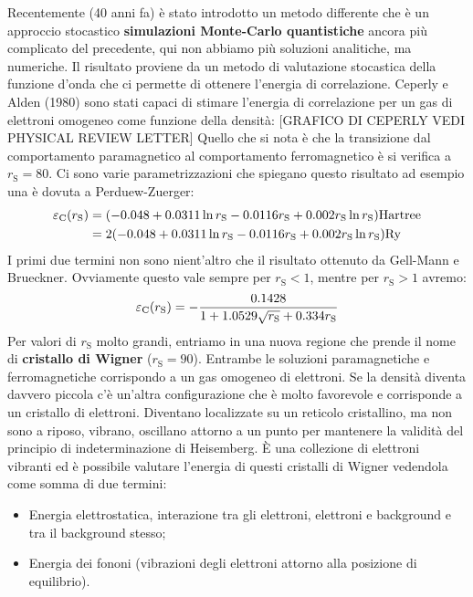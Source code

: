 Recentemente (40 anni fa) è stato introdotto un metodo differente che è un approccio stocastico \textbf{simulazioni Monte-Carlo quantistiche} ancora più complicato del precedente, qui non abbiamo più soluzioni analitiche, ma numeriche. Il risultato proviene da un metodo di valutazione stocastica della funzione d'onda che ci permette di ottenere l'energia di correlazione. Ceperly e Alden (1980) sono stati capaci di stimare l'energia di correlazione per un gas di elettroni omogeneo come funzione della densità:
[GRAFICO DI CEPERLY VEDI PHYSICAL REVIEW LETTER]
Quello che si nota è che la transizione dal comportamento paramagnetico al comportamento ferromagnetico è si verifica a $r_\text{S}=80$. Ci sono varie parametrizzazioni che spiegano questo risultato ad esempio una è dovuta a Perduew-Zuerger:
\begin{equation*}
    \begin{aligned}
    \varepsilon_{\text C}(r_\text{S})& =(-0.048+0.0311 \ln r_\text{S}-0.0116r_\text{S}+0.002r_\text{S}\ln r_\text{S})\text{Hartree}\\
    & =2(-0.048+0.0311 \ln r_\text{S}-0.0116r_\text{S}+0.002r_\text{S}\ln r_\text{S})\text{Ry}
    \end{aligned}
\end{equation*}
I primi due termini non sono nient'altro che il risultato ottenuto da Gell-Mann e Brueckner. Ovviamente questo vale sempre per $r_\text{S}<1$, mentre per $r_\text{S}>1$ avremo:
\begin{equation*}
    \varepsilon_{\text C}(r_\text{S})=-\frac{0.1428}{1+1.0529\sqrt{r_\text{S}}+0.334r_\text{S}}
\end{equation*}
Per valori di $r_\text{S}$ molto grandi, entriamo in una nuova regione che prende il nome di \textbf{cristallo di Wigner} ($r_\text{S}=90$). Entrambe le soluzioni paramagnetiche e ferromagnetiche corrispondo a un gas omogeneo di elettroni. Se la densità diventa davvero piccola c'è un'altra configurazione che è molto favorevole e corrisponde a un cristallo di elettroni. Diventano localizzate su un reticolo cristallino, ma non sono a riposo, vibrano, oscillano attorno a un punto per mantenere la validità del principio di indeterminazione di Heisemberg. È una collezione di elettroni vibranti ed è possibile valutare l'energia di questi cristalli di Wigner vedendola come somma di due termini: 
\begin{itemize}
    \item Energia elettrostatica, interazione tra gli elettroni, elettroni e background e tra il background stesso;
    \item Energia dei fononi (vibrazioni degli elettroni attorno alla posizione di equilibrio).
\end{itemize}
